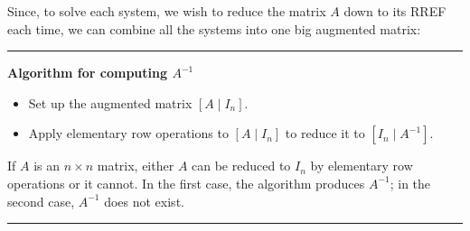 \documentclass{article}
\newif\ifshowanswers
\newcommand{\answer}[2][4cm]{%
	\noindent\framebox[\textwidth]{%
		\begin{minipage}[t][#1][t]{\dimexpr\textwidth-2\fboxsep-2\fboxrule\relax}
			\ifshowanswers
			{\color{answercolor}#2\par}
			\fi
		\end{minipage}%
	}
}
\newcommand{\Ainv}{{A^{-1}}}
\newenvironment{framed}{\par\medskip\hrule\smallskip}
  {\par\smallskip\hrule\medskip}
\newcommand*\dashline{\mathrel{\vert}}
\begin{document}
\answer{
	$A\begin{bmatrix} x_{11} \\ x_{21} \\ \vdots \\ x_{n1} \end{bmatrix} = \begin{bmatrix} 1 \\ 0 \\ \vdots \\ 0 \end{bmatrix},\ 
	A\begin{bmatrix} x_{12} \\ x_{22} \\ \vdots \\ x_{n2} \end{bmatrix} = \begin{bmatrix} 0 \\ 1 \\ \vdots \\ 0 \end{bmatrix},\ 
	\cdots,\ 
	A\begin{bmatrix} x_{1n} \\ x_{2n} \\ \vdots \\ x_{nn} \end{bmatrix} = \begin{bmatrix} 0 \\ 0 \\ \vdots \\ 1 \end{bmatrix}$
}

Since, to solve each system, we wish to reduce the matrix $A$ down to its RREF each time, we can combine all the systems into one big augmented matrix:

\answer{
	$[A \mid I_n] = \left[\begin{array}{rrrr|rrrr} 
		a_{11} & a_{12} & \cdots & a_{1n} & 1 & 0 & \cdots & 0 \\
		a_{21} & a_{22} & \cdots & a_{2n} & 0 & 1 & \cdots & 0 \\
		\vdots & \vdots & \ddots & \vdots & \vdots & \vdots & \ddots & \vdots \\
		a_{n1} & a_{n2} & \cdots & a_{nn} & 0 & 0 & \cdots & 1
	\end{array}\right]$
}

\newpage
\begin{framed}\textbf{Algorithm for computing $A^{-1}$}
	
	\begin{itemize}
		\item Set up the augmented matrix $[A \dashline I_n]$.
		\item  Apply elementary row operations to $[A \dashline I_n]$ to reduce it to $[I_n \dashline \Ainv]$.
	\end{itemize}
	
	If $A$ is an $n\times n$ matrix, either $A$ can be reduced to $I_n$ by elementary row operations or it cannot. In
	the first case, the algorithm produces $A^{-1}$; in the second case, $A^{-1}$  does not exist.
\end{framed}
\end{document}

